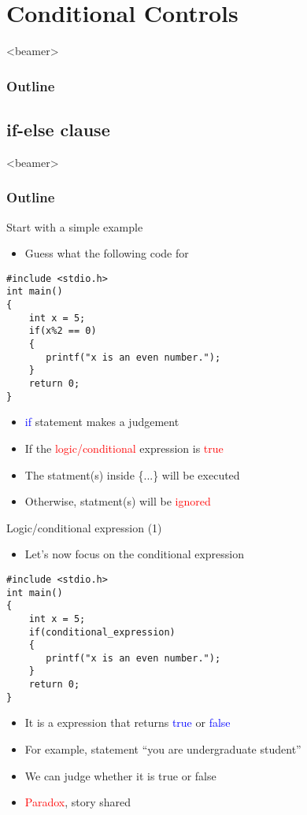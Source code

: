 \section{Conditional Controls}
\begin{frame}<beamer>
    \frametitle{Outline}
    \tableofcontents[currentsection]
\end{frame}

\subsection{if-else clause}
\begin{frame}<beamer>
    \frametitle{Outline}
\end{frame}

\begin{frame}[fragile]{Start with a simple example}
\begin{itemize}
	\item {Guess what the following code for}
\end{itemize}
		\begin{lstlisting}
#include <stdio.h>
int main()
{
    int x = 5;
    if(x%2 == 0)
    {
       printf("x is an even number.");
    }
    return 0;
}
		\end{lstlisting}
\vspace{-0.15in}
\begin{itemize}
	\item {\textcolor{blue}{if} statement makes a judgement}
	\item {If the \textcolor{red}{logic/conditional} expression is \textcolor{red}{true}}
	\item {The statment(s) inside \{...\} will be executed}
	\item {Otherwise, statment(s) will be \textcolor{red}{ignored}}
\end{itemize}
\end{frame}

\begin{frame}[fragile]{Logic/conditional expression (1)}
\begin{itemize}
	\item {Let's now focus on the conditional expression}
\end{itemize}
		\begin{lstlisting}
#include <stdio.h>
int main()
{
    int x = 5;
    if(conditional_expression)
    {
       printf("x is an even number.");
    }
    return 0;
}
		\end{lstlisting}
\vspace{-0.15in}
\begin{itemize}
	\item {It is a expression that returns \textcolor{blue}{true} or \textcolor{blue}{false}}
	\item {For example, statement ``you are undergraduate student''}
	\item {We can judge whether it is true or false}
	\item {\textcolor{red}{Paradox}, story shared}
\end{itemize}
\end{frame}

